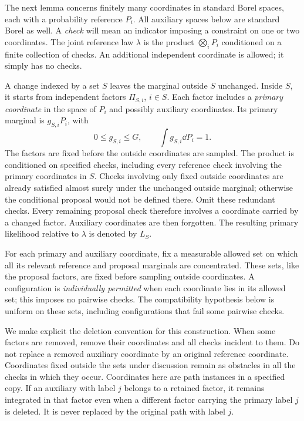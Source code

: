 The next lemma concerns finitely many coordinates in standard Borel spaces,
each with a probability reference $P_i$. All auxiliary spaces below are
standard Borel as well. A \emph{check} will mean an indicator imposing a constraint
on one or two coordinates. The joint reference law $\lambda$ is the product
$\bigotimes_iP_i$ conditioned on a finite collection of checks. An additional
independent coordinate is allowed; it simply has no checks.

A change indexed by a set $S$ leaves the marginal outside $S$ unchanged.
Inside $S$, it starts from independent factors $\Pi_{S,i}$, $i\in S$.
Each factor includes a \emph{primary coordinate} in the space of $P_i$ and
possibly auxiliary coordinates. Its primary marginal is $g_{S,i}P_i$, with
\begin{equation}\label{cmp:factor-density}
 0\le g_{S,i}\le G,
 \qquad \int g_{S,i}\dd P_i=1.
\end{equation}
The factors are fixed before the outside coordinates are sampled. The product
is conditioned on specified checks, including every reference check involving
the primary coordinates in $S$. Checks involving only fixed outside
coordinates are already satisfied almost surely under the unchanged outside
marginal; otherwise the conditional proposal would not be defined there.
Omit these redundant checks. Every remaining proposal check therefore
involves a coordinate carried by a changed factor. Auxiliary coordinates
are then forgotten.
The resulting primary likelihood relative to $\lambda$ is denoted by $L_S$.

For each primary and auxiliary coordinate, fix a measurable allowed set
on which all its relevant reference and proposal marginals are
concentrated. These sets, like the proposal factors, are fixed before
sampling outside coordinates. A configuration is \emph{individually
permitted} when each coordinate lies in its allowed set; this imposes no
pairwise checks. The compatibility hypothesis below is uniform on these
sets, including configurations that fail some pairwise checks.

We make explicit the deletion convention for this construction. When some
factors are removed, remove their coordinates and all checks incident to them.
Do not replace a removed auxiliary coordinate by an original reference
coordinate. Coordinates fixed outside the sets under discussion remain as
obstacles in all the checks in which they occur. Coordinates here are path
instances in a specified copy. If an auxiliary with label $j$ belongs to a
retained factor, it remains integrated in that factor even when a different
factor carrying the primary label $j$ is deleted. It is never replaced by
the original path with label $j$.

